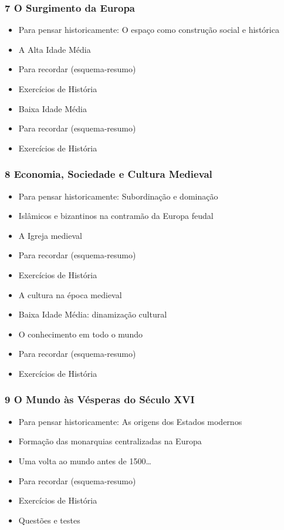 \documentclass[a4paper,12pt]{article}[abntex2]
\begin{document}
\subsubsection*{7 O Surgimento da Europa}

\begin{itemize}
\item Para pensar historicamente: O espaço como construção social e histórica
\item A Alta Idade Média
\item Para recordar (esquema-resumo)
\item Exercícios de História
\item Baixa Idade Média
\item Para recordar (esquema-resumo)
\item Exercícios de História
\end{itemize}
\subsubsection*{8 Economia, Sociedade e Cultura Medieval}

\begin{itemize}
\item Para pensar historicamente: Subordinação e dominação
\item Islâmicos e bizantinos na contramão da Europa feudal
\item A Igreja medieval
\item Para recordar (esquema-resumo)
\item Exercícios de História
\item A cultura na época medieval
\item Baixa Idade Média: dinamização cultural
\item O conhecimento em todo o mundo
\item Para recordar (esquema-resumo)
\item Exercícios de História
\end{itemize}
\subsubsection*{9 O Mundo às Vésperas do Século XVI}

\begin{itemize}
\item Para pensar historicamente: As origens dos Estados modernos
\item Formação das monarquias centralizadas na Europa
\item Uma volta ao mundo antes de 1500…
\item Para recordar (esquema-resumo)
\item Exercícios de História
\item Questões e testes
\end{itemize}
\end{document}
